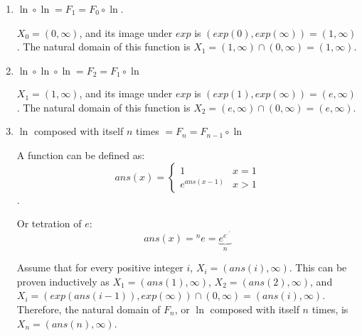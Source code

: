\documentclass{article}
\begin{document}
\begin{enumerate}
\item $\ln \circ \ln = F_1 = F_0 \circ \ln$.

$X_0 = (0, \infty)$, and its image under $exp$ is $(exp(0), exp(\infty)) = (1, \infty)$. The natural domain of this function is $X_1 = (1, \infty) \cap (0, \infty) = (1, \infty)$.

\item $\ln \circ \ln \circ \ln = F_2 = F_1 \circ \ln$

$X_1 = (1, \infty)$, and its image under $exp$ is $(exp(1), exp(\infty)) = (e, \infty)$. The natural domain of this function is $X_2 = (e, \infty) \cap (0, \infty) = (e, \infty)$.

\item $\ln$ composed with itself $n$ times $= F_n = F_{n - 1} \circ \ln$

A function  can be defined as:
$$ans(x) = \left\{
\begin{array}{lc}
1            & x = 1 \\
e^{ans(x-1)} & x > 1
\end{array}
\right.$$.

Or tetration of $e$:
$$ans(x) = {^{n}e} = \underbrace{e^{e^{\cdot^{\cdot^{e}}}}}_n$$

Assume that for every positive integer $i$, $X_i = (ans(i), \infty)$. This can be proven inductively as $X_1 = (ans(1), \infty)$, $X_2 = (ans(2), \infty)$, and $X_i = (exp(ans(i-1)), exp(\infty)) \cap (0, \infty) = (ans(i), \infty)$. Therefore, the natural domain of $F_n$, or $\ln$ composed with itself $n$ times, is $X_n = (ans(n), \infty)$.
\end{enumerate}




\end{document}

